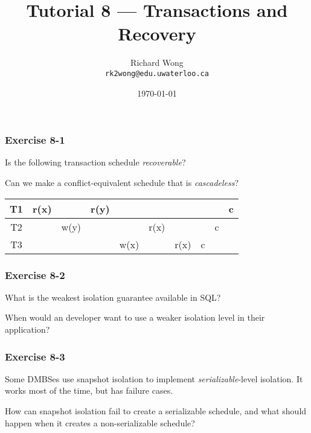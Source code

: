 

\def\ojoin{\setbox0=\hbox{$\bowtie$}%
  \rule[-.02ex]{.25em}{.4pt}\llap{\rule[\ht0]{.25em}{.4pt}}}
\def\leftouterjoin{\mathbin{\ojoin\mkern-5.8mu\bowtie}}

\title{Tutorial 8 --- Transactions and Recovery }

\author{Richard Wong \\ \small \texttt{rk2wong@edu.uwaterloo.ca}}
\date{\today}




\begin{frame}
  \titlepage

\end{frame}


\begin{frame}
\frametitle{Exercise 8-1}

Is the following transaction schedule \textit{recoverable}?

Can we make a conflict-equivalent schedule that is \textit{cascadeless}?

\begin{center}
\begin{tabular}{ c c c c c c c c c c }
  \hline
  T1 & r(x) & & r(y) & & & & & & c \\
  \hline
  T2 & & w(y) & & & r(x) & & & c & \\
  \hline
  T3 & & & & w(x) & & r(x) & c & & \\
  \hline
\end{tabular}
\end{center}

\end{frame}


\begin{frame}
\frametitle{Exercise 8-2}

What is the weakest isolation guarantee available in SQL?

When would an developer want to use a weaker isolation level in their application?

\end{frame}



\begin{frame}
\frametitle{Exercise 8-3}

Some DMBSes use snapshot isolation to implement \textit{serializable}-level isolation. It works most of the time, but has failure cases.

How can snapshot isolation fail to create a serializable schedule, and what should happen when it creates a non-serializable schedule?

\end{frame}


